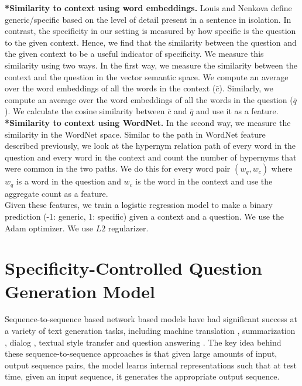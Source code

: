 \documentclass[11pt,a4paper]{article}
\begin{document}
\noindent \textbf{*Similarity to context using word embeddings.} Louis and Nenkova \cite{louis2011automatic} define generic/specific based on the level of detail present in a sentence in isolation. In contrast, the specificity in our setting is measured by how specific is the question to the given context. Hence, we find that the similarity between the question and the given context to be a useful indicator of specificity. We measure this similarity using two ways. In the first way, we measure the similarity between the context and the question in the vector semantic space. We compute an average over the word embeddings of all the words in the context ($\bar{c}$). Similarly, we  compute an average over the word embeddings of all the words in the question ($\bar{q}$). We calculate the cosine similarity between $\bar{c}$ and $\bar{q}$ and use it as a feature. \\
 
\noindent \textbf{*Similarity to context using WordNet.} In the second way, we measure the similarity in the WordNet space. Similar to the path in WordNet feature described previously, we look at the hypernym relation path of every word in the question and every word in the context and count the number of hypernyms that were common in the two paths. We do this for every word pair $(w_q, w_c)$ where $w_q$ is a word in the question and $w_c$ is the word in the context and use the aggregate count as a feature. \\


Given these features, we train a logistic regression model to make a binary prediction (-1: generic, 1: specific) given a context and a question. We use the Adam \cite{kingma2014adam} optimizer. We use $L2$ regularizer. 

\section{Specificity-Controlled Question Generation Model}

Sequence-to-sequence based network based models \citep{sutskever2014sequence} have had significant success at a variety of text generation tasks, 
including machine translation \citep{BahdanauCB15,luong2015effective}, 
summarization \citep{nallapati2016abstractive}, 
dialog \citep{serban2016building,bordes2016learning,li2016persona,serban2017hierarchical}, 
textual style transfer \citep{jhamtani2017shakespearizing,kabbara2016stylistic,rao2018dear} and 
question answering \citep{yin2016neural,serban2016building}.
The key idea behind these sequence-to-sequence approaches is that given large amounts of input, output sequence pairs, the model learns internal representations such that at test time, given an input sequence, it generates the appropriate output sequence. 
\end{document}
